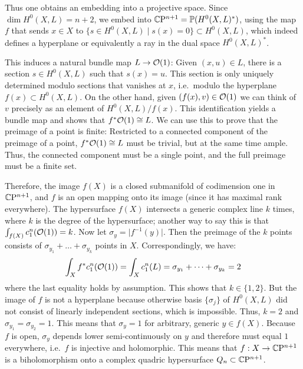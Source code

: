 \begin{myproof}
	Thus one obtains an embedding into a projective space. Since $\dim H^0(X,L)=n+2$, we embed into $\mathbb{C}\mathrm{P}^{n+1}=\mathbb{P}(H^0(X,L)^*)$, using the map $f$ that sends $x\in X$ to $\{s\in H^0(X,L)\mid s(x)=0\}\subset H^0(X,L)$, which indeed defines a hyperplane or equivalently a ray in the dual space $H^0(X,L)^*$.
	
	This induces a natural bundle map $L\to \mathcal{O}(1)$: Given $(x,u)\in L$, there is a section $s\in H^0(X,L)$ such that $s(x)=u$. This section is only uniquely determined modulo sections that vanishes at $x$, i.e.~modulo the hyperplane $f(x)\subset H^0(X,L)$. On the other hand, given $(f(x),v)\in\mathcal{O}(1)$ we can think of $v$ precisely as an element of $H^0(X,L)/f(x)$. This identification yields a bundle map and shows that $f^*\mathcal{O}(1)\cong L$. We can use this to prove that the preimage of a point is finite: Restricted to a connected component of the preimage of a point, $f^*\mathcal{O}(1)\cong L$ must be trivial, but at the same time ample. Thus, the connected component must be a single point, and the full preimage must be a finite set.
	
	Therefore, the image $f(X)$ is a closed submanifold of codimension one in $\mathbb{C}\mathrm{P}^{n+1}$, and $f$ is an open mapping onto its image (since it has maximal rank everywhere). The hypersurface $f(X)$ intersects a generic complex line $k$ times, where $k$ is the degree of the hypersurface; another way to say this is that $\int_{f(X)} c_1^n(\mathcal{O}(1))=k$. Now let $\sigma_y=\lvert f^{-1}(y)\rvert$. Then the preimage of the $k$ points consists of $\sigma_{y_1}+\dots +\sigma_{y_k}$ points in $X$. Correspondingly, we have:
	\begin{equation*}
		\int_X f^*c_1^n(\mathcal{O}(1))=\int_X c_1^n(L)=\sigma_{y_1}+\dots+\sigma_{y_k}=2
	\end{equation*}
	where the last equality holds by assumption. This shows that $k\in \{1,2\}$. But the image of $f$ is not a hyperplane because otherwise basis $\{\sigma_j\}$ of $H^0(X,L)$ did not consist of linearly independent sections, which is impossible. Thus, $k=2$ and $\sigma_{y_1}=\sigma_{y_2}=1$. This means that $\sigma_y=1$ for arbitrary, generic $y\in f(X)$. Because $f$ is open, $\sigma_y$ depends lower semi-continuously on $y$ and therefore must equal $1$ everywhere, i.e.~$f$ is injective and holomorphic. This means that $f:X\to \mathbb{C}\mathrm{P}^{n+1}$ is a biholomorphism onto a complex quadric hypersurface $Q_n\subset \mathbb{C}\mathrm{P}^{n+1}$.	
\end{myproof}

